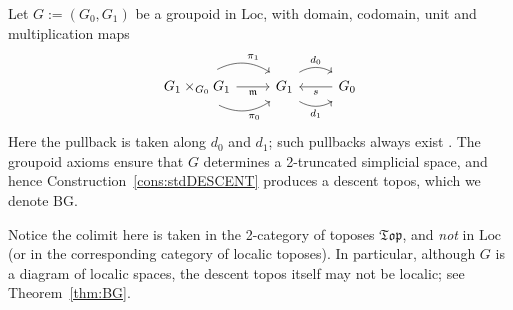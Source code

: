 \documentclass[a4paper, 11pt,reqno]{amsart}
\newcommand{\Loc}{\mathrm{Loc}}
\newcommand{\m}{\mathfrak{m}}
\newcommand{\thT}{\mathbb{T}}
\newcommand{\Des}{\mathrm{Des}}
\newcommand{\BG}{\mathrm{BG}}
\begin{document}
\begin{example}\label{ex:groupoidDESCENT} Let $G:=(G_0,G_1)$ be a groupoid in $\Loc$, with domain, codomain, unit and multiplication maps
	\begin{equation}\label{eq:groupoidEXAMPLE}
	\begin{tikzcd} G_1\times_{G_0}G_1 \ar[r, bend right, shift right=1ex, swap, "\pi_0"] \ar[r,swap,"\m"] \ar[r,bend left, shift left=1ex,  "\pi_1"]& G_1 \ar[r, bend right,shift right=1ex, swap, "d_1"] \ar[r, bend left, shift left=1ex, "d_0"] & G_0 \ar[l, "s"]  
	\end{tikzcd}
	\end{equation}
Here the pullback is taken along $d_0$ and $d_1$; such pullbacks always exist \cite[Theorem B4.1.1]{Elephant}. The groupoid axioms ensure that $G$ determines a 2-truncated simplicial space, and hence Construction~\ref{cons:stdDESCENT} produces a descent topos, which we denote $\BG$. 

\end{example}

\begin{remark} Notice the colimit here is taken in the 2-category of toposes $\mathfrak{Top}$, and {\em not} in $\Loc$ (or in the corresponding category of localic toposes). In particular, although $G$ is a diagram of localic spaces, the descent topos itself may not be localic; see Theorem~\ref{thm:BG}.
\end{remark}
\end{document}
